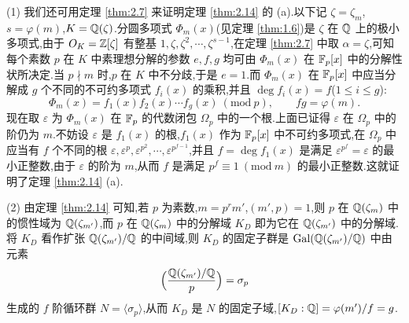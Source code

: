 \begin{remark}
(1) 我们还可用定理 \ref{thm:2.7} 来证明定理 \ref{thm:2.14} 的 (a).以下记 $\zeta=\zeta_m$,$s=\varphi(m)$,$K=\mathbb{Q}(\zeta)$.分圆多项式 $\Phi_m(x)$(见定理 \ref{thm:1.6})是 $\zeta$ 在 $\mathbb{Q}$ 上的极小多项式,由于 $O_K=\mathbb{Z}[\zeta]$ 有整基 $1,\zeta,\zeta^2,\cdots,\zeta^{s-1}$,在定理 \ref{thm:2.7} 中取 $\alpha=\zeta$,可知每个素数 $p$ 在 $K$ 中素理想分解的参数 $e,f,g$ 均可由 $\Phi_m(x)$ 在 $\mathbb{F}_p[x]$ 中的分解性状所决定.当 $p\nmid m$ 时,$p$ 在 $K$ 中不分歧,于是 $e=1$.而 $\Phi_m(x)$ 在 $\mathbb{F}_p[x]$ 中应当分解成 $g$ 个不同的不可约多项式 $f_i(x)$ 的乘积,并且 $\deg f_i(x)=f$($1\leqslant i\leqslant g$):
\[
  \Phi_m(x)=f_1(x)f_2(x)\cdots f_g(x)\ (\mathrm{mod}\ p),\qquad fg=\varphi(m).
\]
现在取 $\varepsilon$ 为 $\Phi_m(x)$ 在 $\mathbb{F}_p$ 的代数闭包 $\Omega_p$ 中的一个根.上面已证得 $\varepsilon$ 在 $\Omega_p$ 中的阶仍为 $m$.不妨设 $\varepsilon$ 是 $f_1(x)$ 的根,$f_1(x)$ 作为 $\mathbb{F}_p[x]$ 中不可约多项式,在 $\Omega_p$ 中应当有 $f$ 个不同的根 $\varepsilon,\varepsilon^p,\varepsilon^{p^2},\cdots,\varepsilon^{p^{f-1}}$,并且 $f=\deg f_1(x)$ 是满足 $\varepsilon^{p^f}=\varepsilon$ 的最小正整数,由于 $\varepsilon$ 的阶为 $m$,从而 $f$ 是满足 $p^f\equiv 1\ (\mathrm{mod}\ m)$ 的最小正整数.这就证明了定理 \ref{thm:2.14} (a).

(2) 由定理 \ref{thm:2.14} 可知,若 $p$ 为素数,$m=p^rm'$,$(m',p)=1$,则 $p$ 在 $\mathbb{Q}(\zeta_m)$ 中的惯性域为 $\mathbb{Q}(\zeta_{m'})$,而 $p$ 在 $\mathbb{Q}(\zeta_m)$ 中的分解域 $K_D$ 即为它在 $\mathbb{Q}(\zeta_{m'})$ 中的分解域.将 $K_D$ 看作扩张 $\mathbb{Q}(\zeta_{m'})/\mathbb{Q}$ 的中间域,则 $K_D$ 的固定子群是 $\operatorname{Gal}(\mathbb{Q}(\zeta_{m'})/\mathbb{Q})$ 中由元素
\[
  \Big(\frac{\mathbb{Q}(\zeta_{m'})/\mathbb{Q}}{p}\Big)=\sigma_p
\]
生成的 $f$ 阶循环群 $N=\langle\sigma_p\rangle$,从而 $K_D$ 是 $N$ 的固定子域,$[K_D:\mathbb{Q}]=\varphi(m')/f=g$.
\end{remark}

